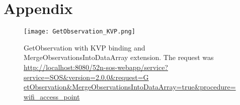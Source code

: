 \chapter{Appendix }
\begin{figure}[H]
\centering
\texttt{[image: GetObservation\_KVP.png]}
\captionsetup{justification=centering}
\caption{GetObservation with KVP binding and MergeObservationsIntoDataArray 
extension. The request was 
\url{http://localhost:8080/52n-sos-webapp/service?service=SOS&version=2.0.0&request=G
etObservation&MergeObservationsIntoDataArray=true&procedure=wifi_access_point}}
\label{figure:getobs}
\end{figure}
